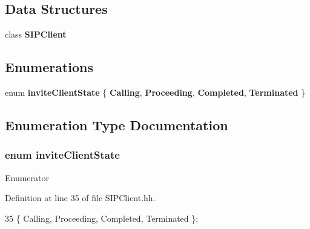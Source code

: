 \subsection*{Data Structures}
\begin{DoxyCompactItemize}
\item 
class {\bf S\+I\+P\+Client}
\end{DoxyCompactItemize}
\subsection*{Enumerations}
\begin{DoxyCompactItemize}
\item 
enum {\bf invite\+Client\+State} \{ {\bf Calling}, 
{\bf Proceeding}, 
{\bf Completed}, 
{\bf Terminated}
 \}
\end{DoxyCompactItemize}


\subsection{Enumeration Type Documentation}
\subsubsection[{invite\+Client\+State}]{\setlength{\rightskip}{0pt plus 5cm}enum {\bf invite\+Client\+State}}\label{SIPClient_8hh_a9b94cc8f795f4fb8a01f6447591e22c1}
\begin{Desc}
\item[Enumerator]\par
\begin{description}
\item[{\em 
Calling\label{SIPClient_8hh_a9b94cc8f795f4fb8a01f6447591e22c1ae785f5a492a0e4552dd463e7cc255b17}
}]\item[{\em 
Proceeding\label{SIPClient_8hh_a9b94cc8f795f4fb8a01f6447591e22c1a77409491680a8fb1a33d625a08e439a7}
}]\item[{\em 
Completed\label{SIPClient_8hh_a9b94cc8f795f4fb8a01f6447591e22c1af47f90c31ee3cdaa28b81ecf57b72ce9}
}]\item[{\em 
Terminated\label{SIPClient_8hh_a9b94cc8f795f4fb8a01f6447591e22c1a0bd9962868a464e4730ffcf8d3fa798d}
}]\end{description}
\end{Desc}


Definition at line 35 of file S\+I\+P\+Client.\+hh.


\begin{DoxyCode}
35 \{ Calling, Proceeding, Completed, Terminated \};
\end{DoxyCode}
